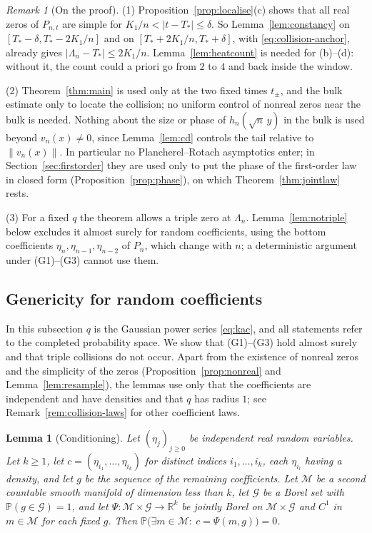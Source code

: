 \documentclass[11pt]{amsart}
\newtheorem{lemma}[theorem]{Lemma}
\theoremstyle{definition}
\theoremstyle{remark}
\newtheorem{remark}[theorem]{Remark}
\numberwithin{equation}{section}
\newcommand{\R}{\mathbb{R}}
\newcommand{\PP}{\mathbb{P}}
\begin{document}
\begin{remark}[On the proof]\label{rem:collision-proof}
(1) Proposition~\ref{prop:localise}(c) shows that all real zeros of $P_{n,t}$ are simple for $K_1/n<|t-T_*|\le\delta$. So Lemma~\ref{lem:constancy} on $[T_*-\delta,T_*-2K_1/n]$ and on $[T_*+2K_1/n,T_*+\delta]$, with \eqref{eq:collision-anchor}, already gives $|\Lambda_n-T_*|\le2K_1/n$. Lemma~\ref{lem:heatcount} is needed for (b)--(d): without it, the count could a priori go from $2$ to $4$ and back inside the window.

(2) Theorem~\ref{thm:main} is used only at the two fixed times $t_\pm$, and the bulk estimate only to locate the collision; no uniform control of nonreal zeros near the bulk is needed. Nothing about the size or phase of $h_n(\sqrt n\,y)$ in the bulk is used beyond $v_n(x)\ne0$, since Lemma~\ref{lem:cd} controls the tail relative to $\|v_n(x)\|$. In particular no Plancherel--Rotach asymptotics enter; in Section~\ref{sec:firstorder} they are used only to put the phase of the first-order law in closed form (Proposition~\ref{prop:phase}), on which Theorem~\ref{thm:jointlaw} rests.

(3) For a fixed $q$ the theorem allows a triple zero at $\Lambda_n$. Lemma~\ref{lem:notriple} below excludes it almost surely for random coefficients, using the bottom coefficients $\eta_n,\eta_{n-1},\eta_{n-2}$ of $P_n$, which change with $n$; a deterministic argument under (G1)--(G3) cannot use them.
\end{remark}

\subsection{Genericity for random coefficients}\label{subsec:collision-generic}
In this subsection $q$ is the Gaussian power series \eqref{eq:kac}, and all statements refer to the completed probability space. We show that (G1)--(G3) hold almost surely and that triple collisions do not occur. Apart from the existence of nonreal zeros and the simplicity of the zeros (Proposition~\ref{prop:nonreal} and Lemma~\ref{lem:resample}), the lemmas use only that the coefficients are independent and have densities and that $q$ has radius $1$; see Remark~\ref{rem:collision-laws} for other coefficient laws.

\begin{lemma}[Conditioning]\label{lem:conditioning}
Let $(\eta_j)_{j\ge0}$ be independent real random variables. Let $k\ge1$, let $c=(\eta_{i_1},\dots,\eta_{i_k})$ for distinct indices $i_1,\dots,i_k$, each $\eta_{i_l}$ having a density, and let $g$ be the sequence of the remaining coefficients. Let $\mathcal M$ be a second countable smooth manifold of dimension less than $k$, let $\mathcal G$ be a Borel set with $\PP(g\in\mathcal G)=1$, and let $\Psi:\mathcal M\times\mathcal G\to\R^k$ be jointly Borel on $\mathcal M\times\mathcal G$ and $C^1$ in $m\in\mathcal M$ for each fixed $g$. Then $\PP\bigl(\exists m\in\mathcal M:\ c=\Psi(m,g)\bigr)=0$.
\end{lemma}
\end{document}
